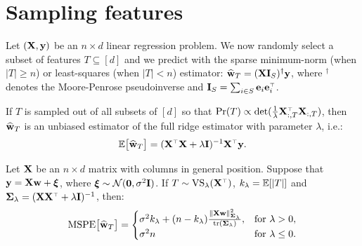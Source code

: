 \documentclass[12pt]{sty/colt2019/colt2018-arxiv}
\begin{document}
\section{Sampling features}
Let $(\mathbf X,\mathbf y)$ be an $n\times d$ linear regression problem. We now
randomly select a subset of features $T\subseteq [d]$ and we predict
with the sparse
minimum-norm (when $|T|\geq n$) or least-squares (when $|T|< n$)
estimator: $\widehat{\mathbf w}_T = (\mathbf X\mathbf I_S)^\dagger\mathbf y$, where $^\dagger$ denotes 
the Moore-Penrose pseudoinverse and $\I_S=\sum_{i\in S}\e_i\e_i^\top$. 
\begin{theorem}
  If $T$ is sampled out of all subsets of $[d]$ so that $\Pr(T)\propto 
  \det(\frac1\lambda\X_{:,T}^\top\X_{:,T})$, then $\widehat{\mathbf w}_T$ is an unbiased
  estimator of the full ridge estimator with parameter $\lambda$, i.e.:
  \begin{align*}
    \E\big[\wbh_T\big] = (\X^\top\X+\lambda\I)^{-1}\X^\top\y.
  \end{align*}
\end{theorem}
\begin{theorem}\label{t:mspe-dual}
  Let $\mathbf X$ be an $n\times d$ matrix with columns in general
  position. Suppose that $\mathbf y=\mathbf X\mathbf w+\boldsymbol\xi$, where
  $\boldsymbol\xi\sim\mathcal{N}(\mathbf 0,\sigma^2\mathbf I)$. If $T\sim\Vol_\lambda(\X^\top)$, $k_\lambda=\mathbb E[|T|]$ and
  $\Sigmab_\lambda=(\X\X^\top+\lambda\I)^{-1}$, then:
  \begin{align*}
    {\mathrm{MSPE}\big[\widehat{\mathbf w}_T\big]}
    =\begin{cases}
    \sigma^2k_\lambda +
    (n-k_\lambda)\frac{\|\mathbf X\mathbf w\|^2_{\mathbf{\Sigma}_\lambda}}{\mathrm{tr}(\mathbf{\Sigma}_\lambda)},
    &\text{for }\lambda>0,\\
    \sigma^2n    &\text{for }\lambda\leq 0.
    \end{cases}
  \end{align*}
\end{theorem}
\end{document}
